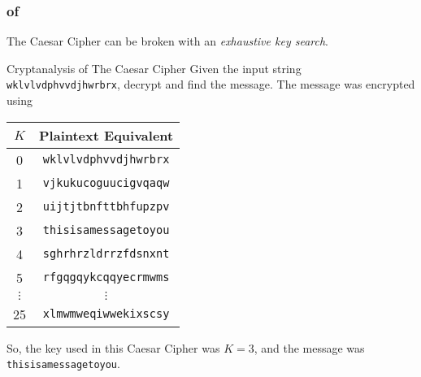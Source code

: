 \subsubsection{ of }\label{subsubsec:Cryptanalysis_Caesar_Cipher}
The Caesar Cipher can be broken with an \emph{exhaustive key search}.
\begin{example}[Lecture 4]{Cryptanalysis of The Caesar Cipher}
  Given the input string \texttt{wklvlvdphvvdjhwrbrx}, decrypt and find the message.
  The message was encrypted using 
  \tcblower{}
  \begin{center}
    \begin{tabular}{cc}
      \toprule
      $K$ & Plaintext Equivalent \\
      \midrule
      0 & \texttt{wklvlvdphvvdjhwrbrx} \\
      1 & \texttt{vjkukucoguucigvqaqw} \\
      2 & \texttt{uijtjtbnfttbhfupzpv} \\
      \midrule
      3 & \texttt{thisisamessagetoyou} \\
      \midrule
      4 & \texttt{sghrhrzldrrzfdsnxnt} \\
      5 & \texttt{rfgqgqykcqqyecrmwms} \\
      $\vdots$ & $\vdots$ \\
      25 & \texttt{xlmwmweqiwwekixscsy} \\
      \bottomrule
    \end{tabular}
  \end{center}

  So, the key used in this Caesar Cipher was $K=3$, and the message was \texttt{thisisamessagetoyou}.
\end{example}

